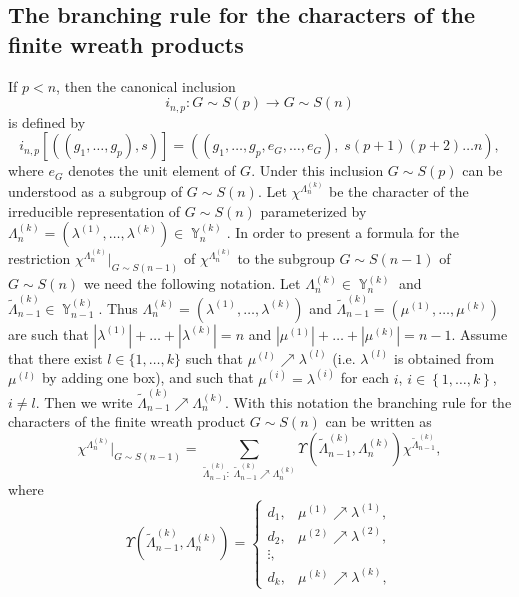 \documentclass[12pt]{amsart}
\theoremstyle{definition}
\numberwithin{equation}{section}
\DeclareMathOperator{\Y}{\mathbb{Y}}
\newcommand{\tLambda}{\widetilde{\Lambda}}
\begin{document}
\subsection{The branching rule for the characters of the finite wreath products}
If $p<n$, then the canonical inclusion
$$
i_{n,p}: G\sim S(p)\longrightarrow G\sim S(n)
$$
is defined by
$$
i_{n,p}\left[\left(\left(g_1,\ldots,g_p\right),s\right)\right]
=\left(\left(g_1,\ldots,g_p,e_{G},\ldots,e_{G}\right),\;s(p+1)(p+2)\ldots n\right),
$$
where $e_{G}$ denotes the unit element of $G$. Under this inclusion $G\sim S(p)$ can be understood as a subgroup of $G\sim S(n)$. Let $\chi^{\Lambda_n^{(k)}}$ be the character of the irreducible representation of $G\sim S(n)$ parameterized by $\Lambda_n^{(k)}=\left(\lambda^{(1)},\ldots,\lambda^{(k)}\right)\in\Y_n^{(k)}$. In order to present a formula for the restriction $\chi^{\Lambda_n^{(k)}}\biggl|_{G\sim S(n-1)}$ of $\chi^{\Lambda_n^{(k)}}$
to the subgroup $G\sim S(n-1)$ of $G\sim S(n)$ we need the following notation. Let $\Lambda_n^{(k)}\in\Y_n^{(k)}$ and $\tLambda_{n-1}^{(k)}\in\Y_{n-1}^{(k)}$.
Thus $\Lambda_n^{(k)}=\left(\lambda^{(1)},\ldots,\lambda^{(k)}\right)$ and
$\tLambda_{n-1}^{(k)}=\left(\mu^{(1)},\ldots,\mu^{(k)}\right)$ are such that
$|\lambda^{(1)}|+\ldots+|\lambda^{(k)}|=n$ and $|\mu^{(1)}|+\ldots+|\mu^{(k)}|=n-1$.
Assume that there exist $l\in\{1,\ldots,k\}$ such that $\mu^{(l)}\nearrow\lambda^{(l)}$
(i.e. $\lambda^{(l)}$ is obtained from $\mu^{(l)}$ by adding one box), and such that $\mu^{(i)}=\lambda^{(i)}$ for each $i$, $i\in\left\{1,\ldots,k\right\}$, $i\neq l$.
Then we write $\tLambda_{n-1}^{(k)}\nearrow\Lambda_n^{(k)}$. With this notation the branching rule for the characters of the finite wreath product $G\sim S(n)$ can be written as
\begin{equation}\label{2.3.branching}
\chi^{\Lambda_n^{(k)}}\biggl|_{G\sim S(n-1)}
=\sum\limits_{\tLambda_{n-1}^{(k)}:\;\tLambda_{n-1}^{(k)}\nearrow\Lambda_n^{(k)}}\Upsilon\left(\tLambda_{n-1}^{(k)},\Lambda_n^{(k)}\right)\chi^{\tLambda_{n-1}^{(k)}},
\end{equation}
where
\begin{equation}\label{2.3.multiplicity}
\Upsilon\left(\tLambda_{n-1}^{(k)},\Lambda_n^{(k)}\right)=\left\{
\begin{array}{ll}
d_1, & \mu^{(1)}\nearrow\lambda^{(1)},\\
d_2, & \mu^{(2)}\nearrow\lambda^{(2)}, \\
\vdots, & \\
d_k, & \mu^{(k)}\nearrow\lambda^{(k)},
\end{array}
\right.
\end{equation}
\end{document}
